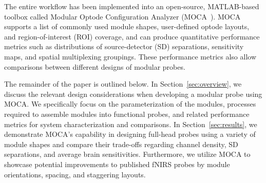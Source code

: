  The entire workflow has been implemented into an open-source, MATLAB-based toolbox called Modular Optode Configuration Analyzer (MOCA~\cite{Vanegas2020}). MOCA supports a list of commonly used module shapes, user-defined optode layouts, and region-of-interest (ROI) coverage, and can produce quantitative performance metrics such as distributions of source-detector (SD) separations, sensitivity maps, and spatial multiplexing groupings. These performance metrics also allow comparisons between different designs of modular probes. 

The remainder of the paper is outlined below. In Section~\ref{sec:overview}, we discuss the relevant design considerations when developing a modular probe using MOCA. We specifically focus on the parameterization of the modules, processes required to assemble modules into functional probes, and related performance metrics for system characterization and comparisons. In Section~\ref{sec:results}, we demonstrate MOCA's capability in designing full-head probes using a variety of module shapes and compare their trade-offs regarding channel density, SD separations, and average brain sensitivities. Furthermore, we utilize MOCA to showcase potential improvements to published fNIRS probes by  module orientations, spacing, and staggering layouts. 